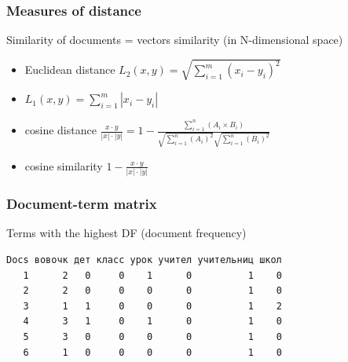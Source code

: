 \documentclass[svgnames]{beamer}
\begin{document}
%
%
%

\begin{frame}
  \frametitle{Measures of distance}
  Similarity of documents = vectors similarity (in N-dimensional space)
  \begin{itemize}
  \item Euclidean distance $L_2(x,y) = \sqrt{\sum_{i=1}^{m}(x_i-y_i)^2}$
  \item $L_1(x,y) = \sum_{i=1}^{m}|x_i-y_i| $
  \item cosine distance $\frac{x\cdot y}{|x|\cdot|y|} = 1 -
    \frac{\sum_{i=1}^{n}(A_i\times B_i)}{\sqrt{\sum_{i=1}^{n}(A_i)^2}\sqrt{\sum_{i=1}^{n}(B_i)^2}}$
  \item cosine similarity  $1-\frac{x\cdot y}{|x|\cdot|y|}$
  \end{itemize}
\end{frame}



\begin{frame}[fragile]
  \frametitle{Document-term matrix}
  Terms with the highest DF (document frequency)
  \footnotesize
\begin{verbatim}
Docs вовочк дет класс урок учител учительниц школ
   1      2   0     0    1      0          1    0
   2      2   0     0    0      0          1    0
   3      1   1     0    0      0          1    2
   4      3   1     0    1      0          1    0
   5      3   0     0    0      0          1    0
   6      1   0     0    0      0          1    0
\end{verbatim}
\end{frame}
\end{document}
